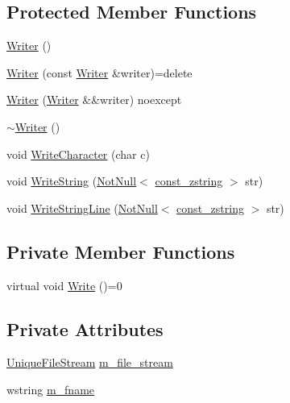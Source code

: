\subsection*{Protected Member Functions}
\begin{DoxyCompactItemize}
\item 
\mbox{\hyperlink{classmage_1_1_writer_a40b6cd3005d509e670c5a49272d9ef27}{Writer}} ()
\item 
\mbox{\hyperlink{classmage_1_1_writer_a2b257938508732ca0b78241aafa7922c}{Writer}} (const \mbox{\hyperlink{classmage_1_1_writer}{Writer}} \&writer)=delete
\item 
\mbox{\hyperlink{classmage_1_1_writer_abda6f6db577201580c0e97c0816e0d3f}{Writer}} (\mbox{\hyperlink{classmage_1_1_writer}{Writer}} \&\&writer) noexcept
\item 
\mbox{\hyperlink{classmage_1_1_writer_aeeb30d6afb1a271b4ad294889054caec}{$\sim$\+Writer}} ()
\item 
void \mbox{\hyperlink{classmage_1_1_writer_aa1ef04f5e69c44afda56704c2823316c}{Write\+Character}} (char c)
\item 
void \mbox{\hyperlink{classmage_1_1_writer_a0efdf73186727b2ae95072b62eddcf5b}{Write\+String}} (\mbox{\hyperlink{namespacemage_a8769f9d670d6b585ea306cb1062af94b}{Not\+Null}}$<$ \mbox{\hyperlink{namespacemage_abfd9206dc607ceb5d13ec68bf075a5c0}{const\+\_\+zstring}} $>$ str)
\item 
void \mbox{\hyperlink{classmage_1_1_writer_abdfd1361df7bb66e284d031f92c85c05}{Write\+String\+Line}} (\mbox{\hyperlink{namespacemage_a8769f9d670d6b585ea306cb1062af94b}{Not\+Null}}$<$ \mbox{\hyperlink{namespacemage_abfd9206dc607ceb5d13ec68bf075a5c0}{const\+\_\+zstring}} $>$ str)
\end{DoxyCompactItemize}
\subsection*{Private Member Functions}
\begin{DoxyCompactItemize}
\item 
virtual void \mbox{\hyperlink{classmage_1_1_writer_a9baf695ef7f6180bef883f60bcb3ac07}{Write}} ()=0
\end{DoxyCompactItemize}
\subsection*{Private Attributes}
\begin{DoxyCompactItemize}
\item 
\mbox{\hyperlink{namespacemage_a0ee1bd45ad7dbb3dc8c8e1770e3538d4}{Unique\+File\+Stream}} \mbox{\hyperlink{classmage_1_1_writer_ac4884215d1b547e990633474bf61c470}{m\+\_\+file\+\_\+stream}}
\item 
wstring \mbox{\hyperlink{classmage_1_1_writer_afa271ee47897d4961e9d62132d8faeb5}{m\+\_\+fname}}
\end{DoxyCompactItemize}


